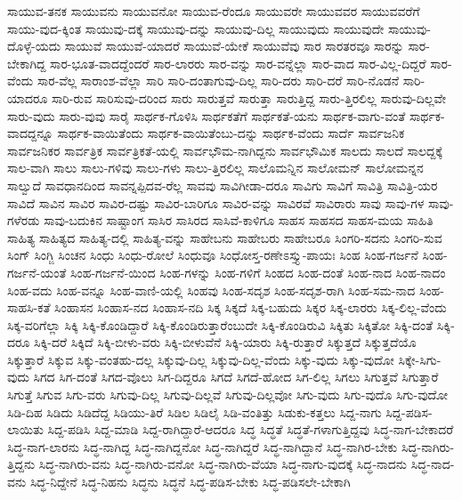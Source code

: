 {ಸಾಯುವ-ತನಕ
ಸಾಯುವನು
ಸಾಯುವನೋ
ಸಾಯುವ-ರೆಂದೂ
ಸಾಯುವರೇ
ಸಾಯುವವರ
ಸಾಯುವವರೆಗೆ
ಸಾಯು-ವುದ-ಕ್ಕಿಂತ
ಸಾಯುವು-ದಕ್ಕೆ
ಸಾಯುವು-ದನ್ನು
ಸಾಯುವು-ದಿಲ್ಲ
ಸಾಯುವುದು
ಸಾಯುವುದೇ
ಸಾಯುವು-ದೊಳ್ಳೆ-ಯದು
ಸಾಯುವೆ
ಸಾಯುವೆ-ಯಾದರೆ
ಸಾಯುವೆ-ಯೇಕೆ
ಸಾಯುವೆವು
ಸಾರ
ಸಾರತರವೂ
ಸಾರನ್ನು
ಸಾರ-ಬೇಕಾಗಿದ್ದ
ಸಾರ-ಭೂತ-ವಾದದ್ದೆಂದರೆ
ಸಾರ-ಲಾರರು
ಸಾರ-ವನ್ನು
ಸಾರ-ವನ್ನೆಲ್ಲಾ
ಸಾರ-ವಾದ
ಸಾರ-ವಿಲ್ಲ-ದಿದ್ದರೆ
ಸಾರ-ವೆಂದು
ಸಾರ-ವೆಲ್ಲ
ಸಾರಾಂಶ-ವೆಲ್ಲಾ
ಸಾರಿ
ಸಾರಿ-ದಂತಾಗುವು-ದಿಲ್ಲ
ಸಾರಿ-ದರು
ಸಾರಿ-ದರೆ
ಸಾರಿ-ನೊಡನೆ
ಸಾರಿ-ಯಾದರೂ
ಸಾರಿ-ರುವ
ಸಾರಿಸುವು-ದರಿಂದ
ಸಾರು
ಸಾರುತ್ತವೆ
ಸಾರುತ್ತಾ
ಸಾರುತ್ತಿದ್ದ
ಸಾರು-ತ್ತಿರಲಿಲ್ಲ
ಸಾರುವು-ದಿಲ್ಲವೇ
ಸಾರು-ವುದು
ಸಾರು-ವುವು
ಸಾರೈ
ಸಾರ್ಥಕ-ಗೊಳಿಸಿ
ಸಾರ್ಥಕತೆಗೆ
ಸಾರ್ಥಕತೆ-ಯನು
ಸಾರ್ಥಕ-ವಾಗು-ವಂತೆ
ಸಾರ್ಥಕ-ವಾದದ್ದನ್ನೂ
ಸಾರ್ಥಕ-ವಾಯಿತೆಂದು
ಸಾರ್ಥಕ-ವಾಯಿತೆಂಬು-ದನ್ನು
ಸಾರ್ಥಕ-ವೆಂದು
ಸಾರ್ದೆ
ಸಾರ್ವಜನಿಕ
ಸಾರ್ವಜನಿಕರ
ಸಾರ್ವತ್ರಿಕ
ಸಾರ್ವತ್ರಿಕತೆ-ಯಲ್ಲಿ
ಸಾರ್ವಭೌಮ-ನಾಗಿದ್ದನು
ಸಾರ್ವಭೌಮಿಕ
ಸಾಲದು
ಸಾಲದೆ
ಸಾಲದ್ದಕ್ಕೆ
ಸಾಲ-ವಾಗಿ
ಸಾಲು
ಸಾಲು-ಗಳಿವು
ಸಾಲು-ಗಳು
ಸಾಲು-ತ್ತಿರಲಿಲ್ಲ
ಸಾಲೊಮನ್ನಿನ
ಸಾಲೋಮನ್
ಸಾಲೋಮನ್ನನ
ಸಾಲ್ವುದೆ
ಸಾವಧಾನದಿಂದ
ಸಾವನ್ನಪ್ಪಿದವ-ರೆಲ್ಲ
ಸಾವವು
ಸಾವಿಗೀಡಾ-ದರೂ
ಸಾವಿಗು
ಸಾವಿಗೆ
ಸಾವಿತ್ರಿ
ಸಾವಿತ್ರಿ-ಯರ
ಸಾವಿದೆ
ಸಾವಿನ
ಸಾವಿರ
ಸಾವಿರ-ದಷ್ಟು
ಸಾವಿರ-ಬಾರಿಗೂ
ಸಾವಿರ-ವನ್ನು
ಸಾವಿರವೆ
ಸಾವಿರಾರು
ಸಾವು
ಸಾವು-ಗಳ
ಸಾವು-ಗಳೆರಡು
ಸಾವು-ಬದುಕಿನ
ಸಾಷ್ಟಾಂಗ
ಸಾಸಿರ
ಸಾಸಿರದ
ಸಾಸಿವೆ-ಕಾಳಿಗೂ
ಸಾಹಸ
ಸಾಹಸದ
ಸಾಹಸ-ಮಯ
ಸಾಹಿತಿ
ಸಾಹಿತ್ಯ
ಸಾಹಿತ್ಯದ
ಸಾಹಿತ್ಯ-ದಲ್ಲಿ
ಸಾಹಿತ್ಯ-ವನ್ನು
ಸಾಹೇಬನು
ಸಾಹೇಬರು
ಸಾಹೇಬರೂ
ಸಿಂಗರಿ-ಸದನು
ಸಿಂಗರಿ-ಸುವ
ಸಿಂಗ್
ಸಿಂಗ್ಜಿ
ಸಿಂಚನ
ಸಿಂಧು
ಸಿಂಧು-ರೋಲೆ
ಸಿಂಧುವೂ
ಸಿಂಧೋಸ್ತ-ರಣೇಽಸ್ತ್ಯು-ಪಾಯಃ
ಸಿಂಹ
ಸಿಂಹ-ಗರ್ಜನೆ
ಸಿಂಹ-ಗರ್ಜನೆ-ಯಂತೆ
ಸಿಂಹ-ಗರ್ಜನೆ-ಯಿಂದ
ಸಿಂಹ-ಗಳನ್ನು
ಸಿಂಹ-ಗಳಿಗೆ
ಸಿಂಹದ
ಸಿಂಹ-ದಂತೆ
ಸಿಂಹ-ನಾದ
ಸಿಂಹ-ನಾದಂ
ಸಿಂಹ-ವದು
ಸಿಂಹ-ವನ್ನೂ
ಸಿಂಹ-ವಾಣಿ-ಯಲ್ಲಿ
ಸಿಂಹವು
ಸಿಂಹ-ಸದೃಶ
ಸಿಂಹ-ಸದೃಶ-ರಾಗಿ
ಸಿಂಹ-ಸಮ-ನಾದ
ಸಿಂಹ-ಸಾಹಸಿ-ಕತೆ
ಸಿಂಹಾಸನ
ಸಿಂಹಾಸ-ನದ
ಸಿಂಹಾಸ-ನದಿ
ಸಿಕ್ಕ
ಸಿಕ್ಕದೆ
ಸಿಕ್ಕ-ಬಹುದು
ಸಿಕ್ಕರ
ಸಿಕ್ಕ-ಲಾರರು
ಸಿಕ್ಕ-ಲಿಲ್ಲ-ವೆಂದು
ಸಿಕ್ಕ-ವರಿಗೆಲ್ಲಾ
ಸಿಕ್ಕಿ
ಸಿಕ್ಕಿ-ಕೊಂಡಿದ್ದಾರೆ
ಸಿಕ್ಕಿ-ಕೊಂಡಿರುತ್ತಾರೆಂಬುದೇ
ಸಿಕ್ಕಿ-ಕೊಂಡಿರುವಿ
ಸಿಕ್ಕಿತು
ಸಿಕ್ಕಿತೋ
ಸಿಕ್ಕಿ-ದಂತೆ
ಸಿಕ್ಕಿ-ದರೂ
ಸಿಕ್ಕಿ-ದರೆ
ಸಿಕ್ಕಿದೆ
ಸಿಕ್ಕಿ-ಬೀಳು-ವರು
ಸಿಕ್ಕಿ-ಬೀಳುವೆನೆ
ಸಿಕ್ಕಿ-ಯಾರು
ಸಿಕ್ಕಿ-ರುತ್ತಾರೆ
ಸಿಕ್ಕುತ್ತದೆ
ಸಿಕ್ಕುತ್ತದೆಯೊ
ಸಿಕ್ಕುತ್ತಾರೆ
ಸಿಕ್ಕುವ
ಸಿಕ್ಕು-ವಂತಹು-ದಲ್ಲ
ಸಿಕ್ಕುವು-ದಿಲ್ಲ
ಸಿಕ್ಕುವು-ದಿಲ್ಲ-ವೆಂದು
ಸಿಕ್ಕು-ವುದು
ಸಿಕ್ಕು-ವುದೋ
ಸಿಕ್ಕೇ-ಸಿಗು-ವುದು
ಸಿಗದ
ಸಿಗ-ದಂತೆ
ಸಿಗದ-ವೊಲು
ಸಿಗ-ದಿದ್ದರೂ
ಸಿಗದೆ
ಸಿಗದೆ-ಹೋದ
ಸಿಗ-ಲಿಲ್ಲ
ಸಿಗಲು
ಸಿಗುತ್ತವೆ
ಸಿಗುತ್ತಾರೆ
ಸಿಗುತ್ತೆ
ಸಿಗುವ
ಸಿಗು-ವರು
ಸಿಗುವು-ದಿಲ್ಲ
ಸಿಗುವು-ದಿಲ್ಲವೆ
ಸಿಗುವು-ದಿಲ್ಲವೋ
ಸಿಗು-ವುದು
ಸಿಗು-ವುದೊ
ಸಿಗು-ವುದೋ
ಸಿಡಿ-ದಿಹ
ಸಿಡಿದು
ಸಿಡಿದೆದ್ದ
ಸಿಡಿಯು-ತಿರೆ
ಸಿಡಿಲ
ಸಿಡಿಲೈ
ಸಿಡಿ-ವಂತಿತ್ತು
ಸಿಡುಕು-ಕತ್ತಲು
ಸಿದ್ದ-ನಾಗು
ಸಿದ್ದ-ಪಡಿಸ-ಲಾಯಿತು
ಸಿದ್ದ-ಪಡಿಸಿ
ಸಿದ್ದ-ಮಾಡಿ
ಸಿದ್ದ-ರಾಗಿದ್ದಾರೆ-ಆದರೂ
ಸಿದ್ಧ
ಸಿದ್ಧತೆ
ಸಿದ್ಧತೆ-ಗಳಾಗುತ್ತಿದ್ದವು
ಸಿದ್ಧ-ನಾಗ-ಬೇಕಾದರೆ
ಸಿದ್ಧ-ನಾಗ-ಲಾರನು
ಸಿದ್ಧ-ನಾಗಿದ್ದ
ಸಿದ್ಧ-ನಾಗಿದ್ದನೋ
ಸಿದ್ಧ-ನಾಗಿದ್ದರೆ
ಸಿದ್ಧ-ನಾಗಿದ್ದಾನೆ
ಸಿದ್ಧ-ನಾಗಿರ-ಬೇಕು
ಸಿದ್ಧ-ನಾಗಿರು-ತ್ತಿದ್ದನು
ಸಿದ್ಧ-ನಾಗಿರು-ವನು
ಸಿದ್ಧ-ನಾಗಿರು-ವನೋ
ಸಿದ್ಧ-ನಾಗಿರು-ವೆಯಾ
ಸಿದ್ಧ-ನಾಗು-ವುದಕ್ಕೆ
ಸಿದ್ಧ-ನಾದನು
ಸಿದ್ಧ-ನಾದ-ವನು
ಸಿದ್ಧ-ನಿದ್ದೇನೆ
ಸಿದ್ಧ-ನಿಹನು
ಸಿದ್ಧನು
ಸಿದ್ಧನೆ
ಸಿದ್ಧ-ಪಡಿಸ-ಬೇಕು
ಸಿದ್ಧ-ಪಡಿಸಲೇ-ಬೇಕಾಗಿ
}
